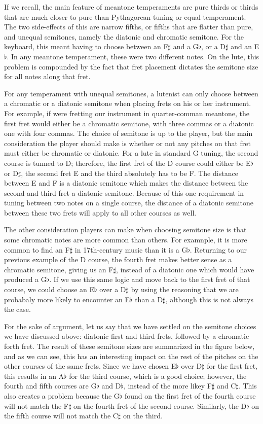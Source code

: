 If we recall, the main feature of meantone temperaments are pure thirds or thirds that are much
closer to pure than Pythagorean tuning or equal temperament.  The two side-effects of this
are narrow fifths, or fifths that are flatter than pure, and unequal semitones, namely the
diatonic and chromatic semitone.  For the keyboard, this meant having to choose between an
F$\sharp$ and a G$\flat$, or a D$\sharp$ and an E$\flat$.  In any meantone temperament, these were two
different notes.  On the lute, this problem is compounded by the fact that fret placement
dictates the semitone size for all notes along that fret.

For any temperament with unequal semitones, a lutenist can only choose
between a chromatic or a diatonic semitone when placing frets on his or her instrument.  For example,
if were fretting our instrument in quarter-comman meantone,
the first fret would either be a chromatic semitone, with three
commas or a diatonic one with four commas.  The choice of semitone is up to the player, but the
main consideration the player should make is whether or not any pitches on that fret must either
be chromatic or diatonic.  For a lute in standard G tuning, the second course is
tunned to D; therefore, the first fret of the D course could either be E$\flat$ or D$\sharp$, the second
fret E and the third absolutely has to be F.  The distance between E and
F is a diatonic semitone which makes the distance between the second and third fret a diatonic
semitone.  Because of this one requirement in tuning between two notes on a single course,
the distance of a diatonic semitone between these two frets will apply to all other courses as well.

The other consideration players can make when choosing semitone size is that some chromatic notes
are more common than others.  For examnple, it is more common to find an F$\sharp$ in 17th-century
music than it is a G$\flat$.  Returning to our previous example of the D course, the fourth fret
makes better sense as a chromatic semitone, giving us an F$\sharp$, instead of a diatonic one
which would have produced a G$\flat$.  If we use this same logic and move back to the first
fret of that course, we could choose an E$\flat$ over a D$\sharp$ by using the reasoning that
we are probabaly more likely to encounter an E$\flat$ than a D$\sharp$, although this is not always
the case.

For the sake of argument, let us say that we have settled on the semitone choices we have discussed
above: diatonic first and third frets, followed by a chromatic forth fret.  The result of these
semitone sizes are summarized in the figure below, and as we can see, this has an interesting
impact on the rest of the pitches on the other courses
of the same frets.  Since we have chosen E$\flat$ over D$\sharp$ for the first fret, this results
in an A$\flat$ for the third course, which is a good choice; however, the fourth and fifth courses
are G$\flat$ and D$\flat$, instead of the more likey F$\sharp$ and C$\sharp$.  This also creates a problem
because the G$\flat$ found on the first fret of the fourth course will not match the F$\sharp$ on the
fourth fret of the second course.  Similarly, the D$\flat$ on the fifth course will not match the
C$\sharp$ on the third.

